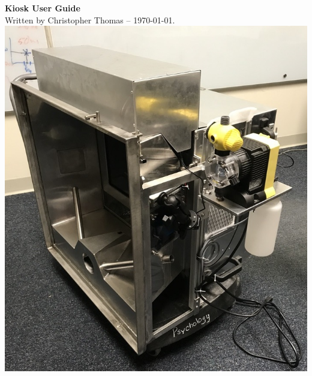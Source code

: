 \documentclass[letterpaper,11pt]{report}
\begin{document}

\pagestyle{empty}

\begin{center}
%
\vspace*{1in}
{\Huge \bfseries Kiosk User Guide} \\
{\footnotesize Written by Christopher Thomas -- \today.} \\
%
\vspace*{1in}
\includegraphics[width=0.7\columnwidth]
{photos/install-20181106/cover-front.jpg}
%
\end{center}
%
\clearpage
%
\pagestyle{plain}
\setcounter{page}{1}
%
\tableofcontents
%
\clearpage
\pagestyle{plain}
\setcounter{page}{1}
\renewcommand{\thispagestyle}[1]{}





\end{document}
